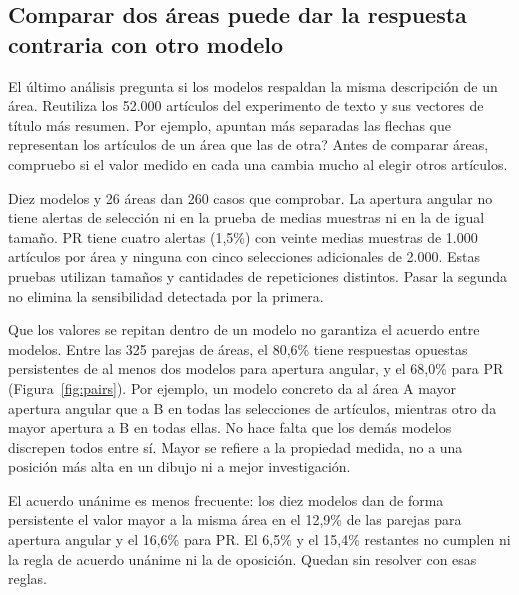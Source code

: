 \documentclass[12pt]{article}
\begin{document}
\FloatBarrier
\subsection{Comparar dos áreas puede dar la respuesta contraria con otro modelo}
El último análisis pregunta si los modelos respaldan la misma descripción de un área. Reutiliza los 52.000 artículos del experimento de texto y sus vectores de título más resumen. Por ejemplo, \textquestiondown{}apuntan más separadas las flechas que representan los artículos de un área que las de otra? Antes de comparar áreas, compruebo si el valor medido en cada una cambia mucho al elegir otros artículos.

Diez modelos y 26 áreas dan 260 casos que comprobar. La apertura angular no tiene alertas de selección ni en la prueba de medias muestras ni en la de igual tamaño. PR tiene cuatro alertas (1,5\%) con veinte medias muestras de 1.000 artículos por área y ninguna con cinco selecciones adicionales de 2.000. Estas pruebas utilizan tamaños y cantidades de repeticiones distintos. Pasar la segunda no elimina la sensibilidad detectada por la primera.

Que los valores se repitan dentro de un modelo no garantiza el acuerdo entre modelos. Entre las 325 parejas de áreas, el 80,6\% tiene respuestas opuestas persistentes de al menos dos modelos para apertura angular, y el 68,0\% para PR (Figura~\ref{fig:pairs}). Por ejemplo, un modelo concreto da al área A mayor apertura angular que a B en todas las selecciones de artículos, mientras otro da mayor apertura a B en todas ellas. No hace falta que los demás modelos discrepen todos entre sí. Mayor se refiere a la propiedad medida, no a una posición más alta en un dibujo ni a mejor investigación.

El acuerdo unánime es menos frecuente: los diez modelos dan de forma persistente el valor mayor a la misma área en el 12,9\% de las parejas para apertura angular y el 16,6\% para PR. El 6,5\% y el 15,4\% restantes no cumplen ni la regla de acuerdo unánime ni la de oposición. Quedan sin resolver con esas reglas.
\end{document}
